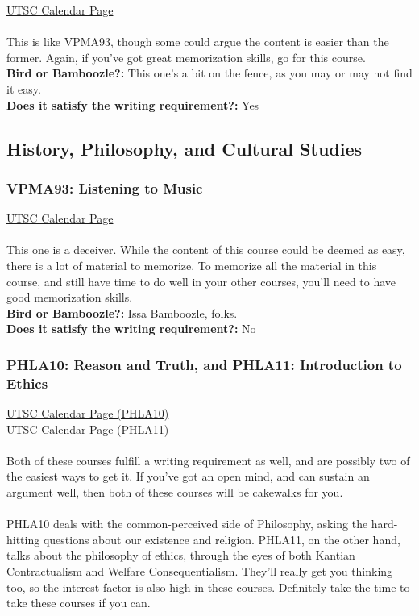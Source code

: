 \documentclass[11pt]{article}
\begin{document}
\href{https://utsc.calendar.utoronto.ca/course/LINA01H3}{UTSC Calendar Page}\\\\
This is like VPMA93, though some could argue the content is easier than
the former. Again, if you've got great memorization skills, go for this
course. \\

\textbf{Bird or Bamboozle?:} This one's a bit on the fence, as you may
or may not find it easy.\\

\textbf{Does it satisfy the writing requirement?:} Yes

\subsection{History, Philosophy, and Cultural Studies}
\subsubsection{VPMA93: Listening to Music}

\href{https://utsc.calendar.utoronto.ca/course/VPMA93H3}{UTSC Calendar Page}\\\\
This one is a deceiver. While the content of this course could be deemed
as easy, there is a lot of material to memorize. To memorize all the
material in this course, and still have time to do well in your other
courses, you'll need to have good memorization skills.\\

\textbf{Bird or Bamboozle?:} Issa Bamboozle, folks.\\

\textbf{Does it satisfy the writing requirement?:} No

\subsubsection{PHLA10: Reason and Truth, and PHLA11: Introduction to Ethics}
\href{https://utsc.calendar.utoronto.ca/course/PHLA10H3}
{UTSC Calendar Page (PHLA10)}\\
\href{https://utsc.calendar.utoronto.ca/course/PHLA11H3}
{UTSC Calendar Page (PHLA11)}\\\\
Both of these courses fulfill a writing requirement as well, and are
possibly two of the easiest ways to get it. If you've got an open mind,
and can sustain an argument well, then both of these courses will be
cakewalks for you.\\\\ 
PHLA10 deals with the common-perceived side of
Philosophy, asking the hard-hitting questions about our existence and
religion. PHLA11, on the other hand, talks about the philosophy of
ethics, through the eyes of both Kantian Contractualism and Welfare
Consequentialism. They'll really get you thinking too, so the interest
factor is also high in these courses. Definitely take the time to take
these courses if you can.\\
\end{document}
